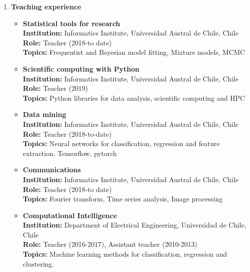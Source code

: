 \documentclass[letterpaper,11pt]{article}
\newcommand{\compactlist}{\setlength{\parskip}{0pt} \setlength{\leftskip}{2em}}
\begin{document}
\begin{enumerate}[I]
	
	    
	\item \textbf{Teaching experience}
	
		\begin{itemize}  \compactlist
        \item \textbf{Statistical tools for research} \\
            \textbf{Institution:} Informatics Institute, Universidad Austral de Chile, Chile \\
                \textbf{Role:} Teacher (2018-to date) \\
                \textbf{Topics:} Frequentist and Bayesian model fitting, Mixture models, MCMC
        \item \textbf{Scientific computing with Python} \\
            \textbf{Institution:} Informatics Institute, Universidad Austral de Chile, Chile \\
            \textbf{Role:} Teacher (2019) \\
            \textbf{Topics:} Python libraries for data analysis, scientific computing and HPC \\
		\item \textbf{Data mining}\\
		    \textbf{Institution:} Informatics Institute, Universidad Austral de Chile, Chile \\
            \textbf{Role:} Teacher (2018-to-date) \\
            \textbf{Topics:} Neural networks for classification, regression and feature extraction. Tensorflow, pytorch
        \item \textbf{Communications} \\
		    \textbf{Institution:} Informatics Institute, Universidad Austral de Chile, Chile \\
            \textbf{Role:} Teacher (2018-to date) \\
            \textbf{Topics:} Fourier transform, Time series analysis, Image processing
        \item \textbf{Computational Intelligence} \\
            \textbf{Institution:} Department of Electrical Engineering, Universidad de Chile, Chile \\
            \textbf{Role:} Teacher (2016-2017), Assistant teacher (2010-2013)\\
            \textbf{Topics:} Machine learning methods for classification, regression and clustering. %

\end{itemize}
\end{enumerate}
\end{document}
